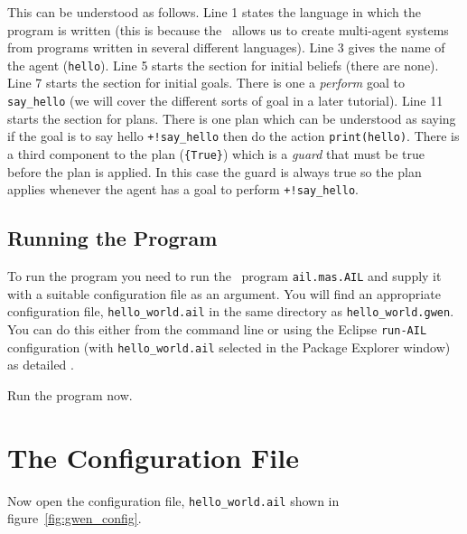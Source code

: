 This can be understood as follows.  Line 1 states the language in which the program is written (this is because the \ail\ allows us to create multi-agent systems from programs written in several different languages).  Line 3 gives the name of the agent (\lstinline{hello}).  Line 5 starts the section for initial beliefs (there are none).  Line 7 starts the section for initial goals.  There is one a \emph{perform} goal to \lstinline{say_hello} (we will cover the different sorts of goal in a later tutorial).  Line 11 starts the section for plans.  There is one plan which can be understood as saying if the goal is to say hello \lstinline{+!say_hello} then do the action \lstinline{print(hello)}.  There is a third component to the plan (\lstinline+{True}+) which is a \emph{guard} that must be true before the plan is applied.  In this case the guard is always true so the plan applies whenever the agent has a goal to perform \lstinline{+!say_hello}.

\subsection{Running the Program}

To run the program          you need to   run the \java\ program \texttt{ail.mas.AIL} and supply it with a suitable configuration file as an argument.  You will find an appropriate configuration file, \texttt{hello\_world.ail} in the same directory as \texttt{hello\_world.gwen}.  You can do this either from the command line or using the Eclipse \texttt{run-AIL} configuration (with \texttt{hello\_world.ail} selected in the Package Explorer window) as detailed .

Run the program now.

\section{The Configuration File}
Now open the configuration file, \texttt{hello\_world.ail} shown in figure~\ref{fig:gwen_config}.

